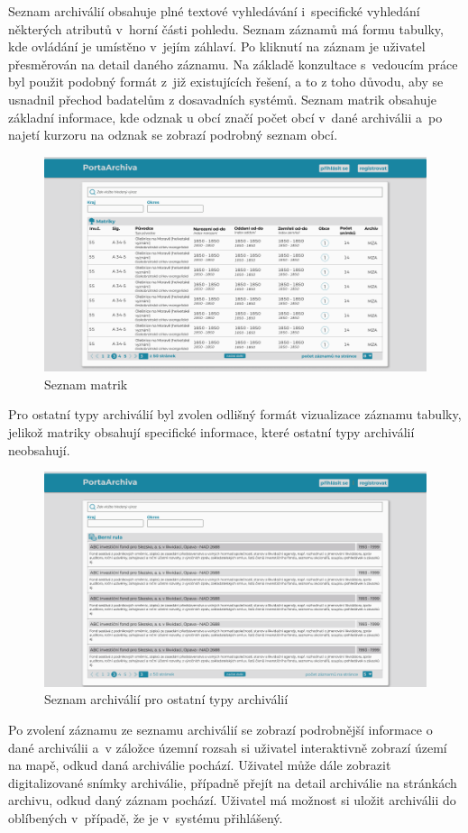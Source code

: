 \newpage
\noindent
Seznam archiválií obsahuje plné textové vyhledávání i~specifické vyhledání některých atributů v~horní části pohledu. Seznam záznamů má formu tabulky, kde ovládání je umístěno v~jejím záhlaví. Po kliknutí na záznam je uživatel přesměrován na detail daného záznamu. Na základě konzultace s~vedoucím práce byl použit podobný formát z~již existujících řešení, a to z toho důvodu, aby se usnadnil přechod badatelům z dosavadních systémů.
\newpara
Seznam matrik obsahuje základní informace, kde odznak u obcí značí počet obcí v~dané archiválii a~po najetí kurzoru na odznak se zobrazí podrobný seznam obcí.

\begin{figure}[htbp]
\centering
    \includegraphics[scale=.4]{obrazky-figures/design/figma/List Page Matriky.png}
    \caption{Seznam matrik}
\end{figure}

\newpage
\noindent
Pro ostatní typy archiválií byl zvolen odlišný formát vizualizace záznamu tabulky, jelikož matriky obsahují specifické informace, které ostatní typy archiválií neobsahují.

\begin{figure}[htbp]
\centering
    \includegraphics[scale=.4]{obrazky-figures/design/figma/List Page Ostatni.png}
    \caption{Seznam archiválií pro ostatní typy archiválií}
\end{figure}
\noindent
Po zvolení záznamu ze seznamu archiválií se zobrazí podrobnější informace o dané archiválii a~v záložce územní rozsah si uživatel interaktivně zobrazí území na mapě, odkud daná archiválie pochází. Uživatel může dále zobrazit digitalizované snímky archiválie, případně přejít na detail archiválie na stránkách archivu, odkud daný záznam pochází. Uživatel má možnost si uložit archiválii do oblíbených v~případě, že je v~systému přihlášený.

